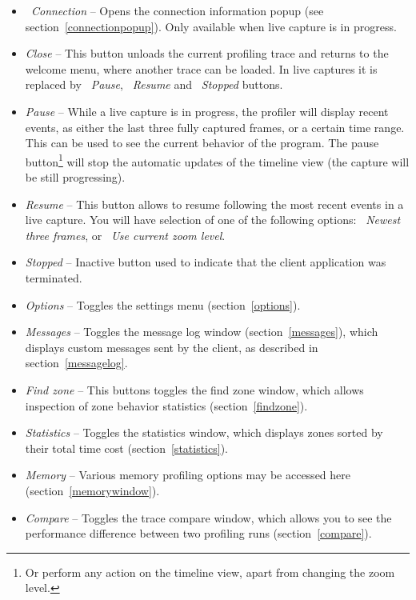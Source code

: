 \documentclass[hidelinks,titlepage,a4paper]{article}
\begin{document}
\begin{itemize}
\item \emph{\faWifi{}~Connection} -- Opens the connection information popup (see section~\ref{connectionpopup}). Only available when live capture is in progress.
\item \emph{\faPowerOff{} Close} -- This button unloads the current profiling trace and returns to the welcome menu, where another trace can be loaded. In live captures it is replaced by \emph{\faPause{}~Pause}, \emph{\faPlay{}~Resume} and \emph{\faSquare{}~Stopped} buttons.
\item \emph{\faPause{} Pause} -- While a live capture is in progress, the profiler will display recent events, as either the last three fully captured frames, or a certain time range. This can be used to see the current behavior of the program. The pause button\footnote{Or perform any action on the timeline view, apart from changing the zoom level.} will stop the automatic updates of the timeline view (the capture will be still progressing).
\item \emph{\faPlay{} Resume} -- This button allows to resume following the most recent events in a live capture. You will have selection of one of the following options: \emph{\faSearchPlus{}~Newest three frames}, or \emph{\faRulerHorizontal{}~Use current zoom level}.
\item \emph{\faSquare{} Stopped} -- Inactive button used to indicate that the client application was terminated.
\item \emph{\faCog{} Options} -- Toggles the settings menu (section~\ref{options}).
\item \emph{\faTags{} Messages} -- Toggles the message log window (section~\ref{messages}), which displays custom messages sent by the client, as described in section~\ref{messagelog}.
\item \emph{\faSearch{} Find zone} -- This buttons toggles the find zone window, which allows inspection of zone behavior statistics (section~\ref{findzone}).
\item \emph{\faSortAmountUp{} Statistics} -- Toggles the statistics window, which displays zones sorted by their total time cost (section~\ref{statistics}).
\item \emph{\faMemory{} Memory} -- Various memory profiling options may be accessed here (section~\ref{memorywindow}).
\item \emph{\faBalanceScale{} Compare} -- Toggles the trace compare window, which allows you to see the performance difference between two profiling runs (section~\ref{compare}).

\end{itemize}
\end{document}
